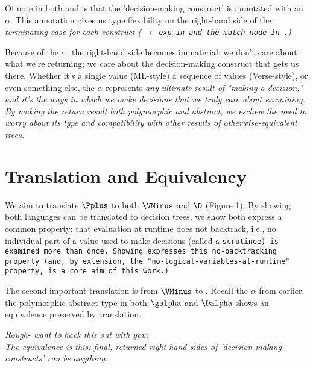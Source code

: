 \documentclass{article}
\begin{document}
Of note in both \VMinus and \D is that the 'decision-making construct' is 
annotated with an $\alpha$. This annotation gives us type flexibility on the 
right-hand side of the \it{terminating} case for each construct 
(\tt{$\rightarrow$ exp} in \VMinus and the match node in \D.) 

Because of the $\alpha$, the right-hand side becomes immaterial: we don't care
about what we're returning; we care about the decision-making construct that
gets us there. Whether it's a single value (ML-style) a sequence of values
(Verse-style), or even something else, the $\alpha$ represents \it{any} ultimate
result of "making a decision," and it's the ways in which we make decisions that
we truly care about examining. By making the return result both polymorphic and
abstract, we eschew the need to worry about its type and compatibility with
other results of otherwise-equivalent trees. 

\section{Translation and Equivalency}

We aim to translate $\Pplus$ to both $\VMinus$ and $\D$ (Figure 1). By showing both
languages can be translated to decision trees, we show both express a common
property: that evaluation at runtime does not backtrack, i.e., no individual
part of a value used to make decisions (called a \tt{scrutinee}) is examined
more than once. Showing \VMinus expresses this no-backtracking property (and, by
extension, the "no-logical-variables-at-runtime" property, is a core aim of this
work.)

The second important translation is from $\VMinus$ to \D. Recall the $\alpha$ from
earlier: the polymorphic abstract type in both $\galpha$ and $\Dalpha$ shows
an equivalence preserved by translation. 

\it{Rough- want to hack this out with you:} \\
The equivalence is this: final, returned right-hand sides of 'decision-making 
constructs' can be anything. 
\end{document}
